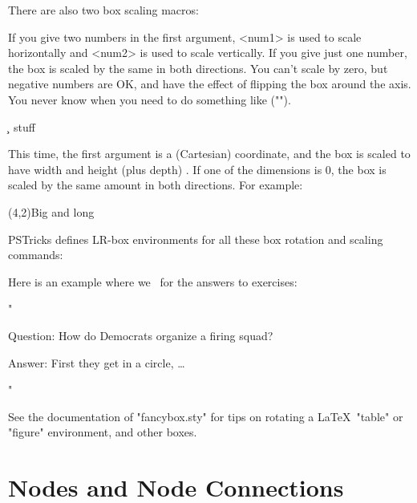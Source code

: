 There are also two box scaling macros:
\begin{description}

\mitem  \scalebox{num1 `num2'}{stuff}

  If you give two numbers in the first argument, <num1> is used to scale
horizontally and <num2> is used to scale vertically. If you give just one
number, the box is scaled by the same in both directions. You can't scale by
zero, but negative numbers are OK, and have the effect of flipping the box
around the axis. You never know when you need to do something like
\scalebox{-1 1}{this} ("\scalebox{-1 1}{this}").

\mitem  {}\c~{stuff}

  This time, the first argument is a (Cartesian) coordinate, and the box is
scaled to have width \x{} and height (plus depth) \y{}. If one of the
dimensions is 0, the box is scaled by the same amount in both directions. For
example:
\begin{example**}
  (4,2){Big and long}
\end{example**}

\end{description}

PSTricks defines LR-box environments for all these box rotation and scaling
commands:
\begin{LVerb}
\end{LVerb}

Here is an example where we \n\Rotatedown\ for the answers to exercises:
\begin{example**}
  "\parbox{4cm}{\raggedright\noindent\hsize 4cm
  Question: How do Democrats organize a firing squad?

  \begin{Rotatedown}
    \parbox{\hsize}{Answer: First they get in a circle, \ldots\hss}%
  \end{Rotatedown}
  "}
\end{example**}

See the documentation of "fancybox.sty" for tips on rotating a \LaTeX\ "table"
or "figure" environment, and other boxes.


\part{Nodes and Node Connections\label{P-nodes}}

